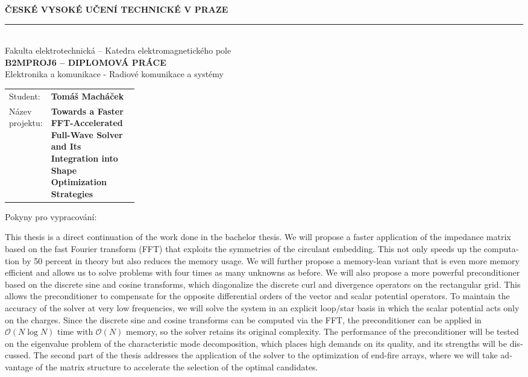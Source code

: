 \documentclass[11pt, a4paper]{article}
\newcommand{\kod}{B2MPROJ6}
\newcommand{\program}{Elektronika a komunikace - Radiové komunikace a systémy}
\newcommand{\student}{Tomáš Macháček}
\begin{document}
\begin{center}
    {\Large\bfseries ČESKÉ VYSOKÉ UČENÍ TECHNICKÉ V PRAZE} \\[0.5ex]
    \rule{\linewidth}{0.4pt} \\[0.5ex]
    {\large Fakulta elektrotechnická -- Katedra elektromagnetického pole} \\[3ex]
    {\LARGE\bfseries \kod{} -- DIPLOMOVÁ PRÁCE} \\[1ex]
    {\large \program}
\end{center}

\vspace{2ex}

\begin{tabularx}{\linewidth}{@{} p{0.25\linewidth} X @{}}
    Student: & \textbf{\student} \\[2ex]
    Název projektu: & \raggedright\textbf{\foreignlanguage{english}{Towards a Faster FFT-Accelerated Full-Wave Solver and Its Integration into Shape Optimization Strategies}}
\end{tabularx}

\vspace{2ex}

Pokyny pro vypracování: \\[0.5ex]
\begin{otherlanguage}{english}
This thesis is a direct continuation of the work done in the bachelor thesis. We will propose a faster application of the impedance matrix based on the fast Fourier transform (FFT) that exploits the symmetries of the circulant embedding. This not only speeds up the computation by 50 percent in theory but also reduces the memory usage. We will further propose a memory-lean variant that is even more memory efficient and allows us to solve problems with four times as many unknowns as before. We will also propose a more powerful preconditioner based on the discrete sine and cosine transforms, which diagonalize the discrete curl and divergence operators on the rectangular grid. This allows the preconditioner to compensate for the opposite differential orders of the vector and scalar potential operators. To maintain the accuracy of the solver at very low frequencies, we will solve the system in an explicit loop/star basis in which the scalar potential acts only on the charges. Since the discrete sine and cosine transforms can be computed via the FFT, the preconditioner can be applied in $\mathcal{O}(N \log N)$ time with $\mathcal{O}(N)$ memory, so the solver retains its original complexity. The performance of the preconditioner will be tested on the eigenvalue problem of the characteristic mode decomposition, which places high demands on its quality, and its strengths will be discussed. The second part of the thesis addresses the application of the solver to the optimization of end-fire arrays, where we will take advantage of the matrix structure to accelerate the selection of the optimal candidates.
\end{otherlanguage}
\end{document}

